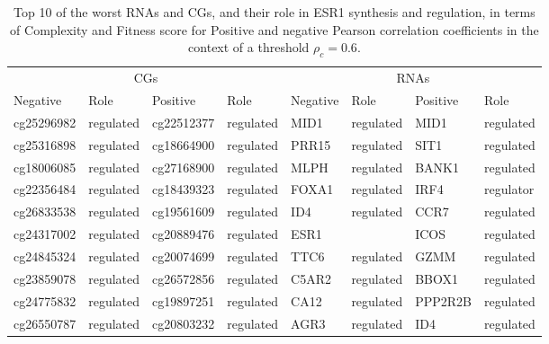 \documentclass[10pt,a4paper]{article}
\begin{document}
 \begin{table}[h!]
\centering
\caption{\label{tab:tab4}Top 10 of the worst RNAs and CGs, and their role in ESR1 synthesis and regulation, in terms of Complexity and Fitness score for Positive and negative Pearson correlation coefficients in the context of a threshold $\rho_{c} = 0.6$.}
\begin{tabular}{|ll|ll|ll|ll|}
\cline{1-8}
\multicolumn{4}{|c}{CGs}&\multicolumn{4}{c|}{RNAs}\\
\cline{1-8}
Negative & Role & Positive & Role & Negative & Role & Positive & Role\\
\cline{1-8}
cg25296982 & regulated & cg22512377 & regulated & MID1 & regulated & MID1 & regulated\\
cg25316898 & regulated & cg18664900 & regulated & PRR15 & regulated & SIT1 & regulated\\
cg18006085 & regulated & cg27168900 & regulated & MLPH & regulated & BANK1 & regulated\\
cg22356484 & regulated & cg18439323 & regulated & FOXA1 & regulated & IRF4 & regulator\\
cg26833538 & regulated & cg19561609 & regulated & ID4 & regulated & CCR7 & regulated\\
cg24317002 & regulated & cg20889476 & regulated & ESR1 & & ICOS & regulated\\
cg24845324 & regulated & cg20074699 & regulated & TTC6 & regulated & GZMM & regulated\\
cg23859078 & regulated & cg26572856 & regulated & C5AR2 & regulated & BBOX1 & regulated\\
cg24775832 & regulated & cg19897251 & regulated & CA12 & regulated & PPP2R2B & regulated\\
cg26550787 & regulated & cg20803232 & regulated & AGR3 & regulated & ID4 & regulated\\
\cline{1-8}
\end{tabular}
\end{table}
\end{document}
